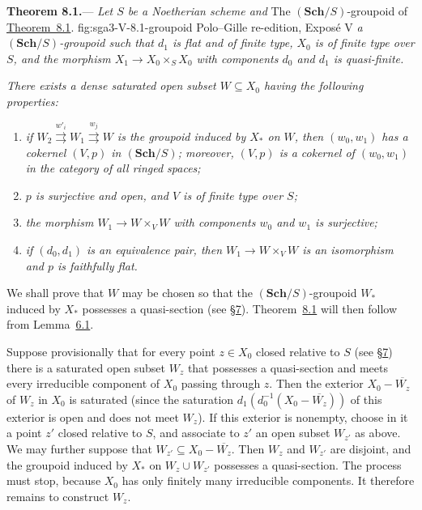 \medskip
{}\label{thm:sga3-V-8.1}
\noindent\textbf{Theorem 8.1.}---%
\textit{Let \(S\) be a Noetherian scheme and}
  {The \((\mathbf{Sch}/S)\)-groupoid of \hyperref[thm:sga3-V-8.1]{Theorem~8.1}.}
  {fig:sga3-V-8.1-groupoid}
  {Polo--Gille re-edition, Expos\'e V}
\textit{a \((\mathbf{Sch}/S)\)-groupoid such that \(d_1\) is flat and
of finite type, \(X_0\) is of finite type over \(S\), and the morphism
\(X_1\to X_0\times_S X_0\) with components \(d_0\) and \(d_1\) is
quasi-finite.}

\textit{There exists a dense saturated open subset \(W\subseteq X_0\)
having the following properties:}
\begin{enumerate}
\item[(i)]\label{thm:sga3-V-8.1-i}%
  \textit{if
  \(W_2\overset{w'_i}{\rightrightarrows}
    W_1\overset{w_j}{\rightrightarrows}W\)
  is the groupoid induced by \(X_\ast\) on \(W\), then
  \((w_0,w_1)\) has a cokernel \((V,p)\) in
  \((\mathbf{Sch}/S)\); moreover, \((V,p)\) is a cokernel of
  \((w_0,w_1)\) in the category of all ringed spaces;}
\item[(ii)]\label{thm:sga3-V-8.1-ii}%
  \textit{\(p\) is surjective and open, and \(V\) is of finite type over
  \(S\);}
\item[(iii)]\label{thm:sga3-V-8.1-iii}%
  \textit{the morphism \(W_1\to W\times_VW\) with components \(w_0\)
  and \(w_1\) is surjective;}
\item[(iv)]\label{thm:sga3-V-8.1-iv}%
  \textit{if \((d_0,d_1)\) is an equivalence pair, then
  \(W_1\to W\times_VW\) is an isomorphism and \(p\) is faithfully
  flat.}
\end{enumerate}

We shall prove that \(W\) may be chosen so that the
\((\mathbf{Sch}/S)\)-groupoid \(W_\ast\) induced by \(X_\ast\)
possesses a quasi-section (see \hyperref[sec:sga3-V-7]{\S7}).
Theorem~\hyperref[thm:sga3-V-8.1]{8.1} will then follow from
Lemma~\hyperref[lem:sga3-V-6.1]{6.1}.

Suppose provisionally that for every point \(z\in X_0\) closed
relative to \(S\) (see \hyperref[sec:sga3-V-7]{\S7}) there is a
saturated open subset \(W_z\) that possesses a quasi-section and meets
every irreducible component of \(X_0\) passing through \(z\). Then the
exterior \(X_0-\overline{W_z}\) of \(W_z\) in \(X_0\) is saturated (since the
saturation \(d_1(d_0^{-1}(X_0-\overline{W_z}))\) of this exterior is open and
does not meet \(W_z\)). If this exterior is nonempty, choose in it a point
\(z'\) closed relative to \(S\), and associate to \(z'\) an open subset
\(W_{z'}\) as above. We may further suppose that
\(W_{z'}\subseteq X_0-\overline{W_z}\). Then \(W_z\) and
\(W_{z'}\) are disjoint, and the groupoid induced by \(X_\ast\) on
\(W_z\cup W_{z'}\) possesses a quasi-section. The process must stop,
because \(X_0\) has only finitely many irreducible components. It
therefore remains to construct \(W_z\).

